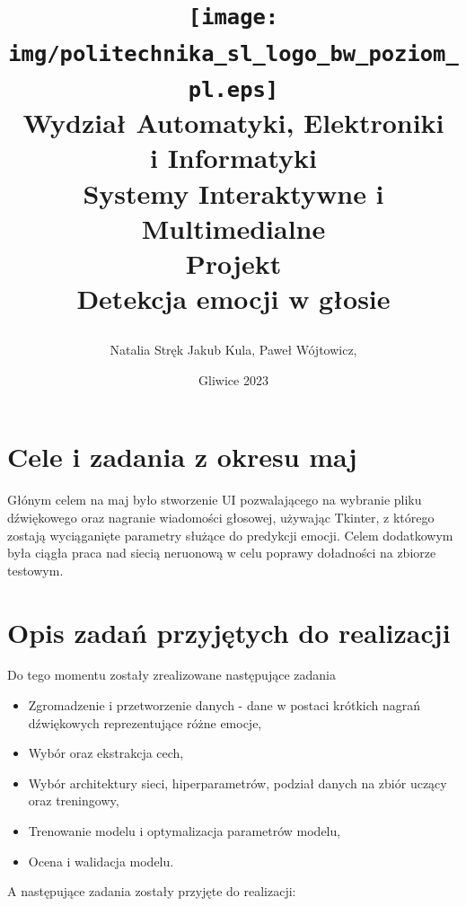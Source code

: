 \documentclass[12pt,titlepage]{article}
\title{
\texttt{[image: img/politechnika\_sl\_logo\_bw\_poziom\_pl.eps]}\\
\textbf{Wydział Automatyki, Elektroniki\\
i Informatyki}\\
\vspace*{1cm}
Systemy Interaktywne i Multimedialne \\ Projekt \\ Detekcja emocji w głosie

\vspace*{5cm}
}
\author{
Natalia Stręk
Jakub Kula,
Paweł Wójtowicz,
}
\date{Gliwice 2023}
\begin{document}
\maketitle

\tableofcontents

\newpage
\section{Cele i zadania z okresu maj}
Głónym celem na maj było stworzenie UI pozwalającego na wybranie pliku dźwiękowego oraz nagranie wiadomości głosowej, używając Tkinter, z którego zostają wyciąganięte parametry służące do predykcji emocji. Celem dodatkowym była ciągła praca nad siecią neruonową w celu poprawy doładności na zbiorze testowym.

\section{Opis zadań przyjętych do realizacji}
Do tego momentu zostały zrealizowane następujące zadania
\begin{itemize}
    \item Zgromadzenie i przetworzenie danych - dane w postaci krótkich nagrań dźwiękowych reprezentujące różne emocje,
    \item Wybór oraz ekstrakcja cech,
    \item Wybór architektury sieci, hiperparametrów, podział danych na zbiór uczący oraz treningowy,
    \item Trenowanie modelu i optymalizacja parametrów modelu,
    \item Ocena i walidacja modelu.
\end{itemize}

A następujące zadania zostały przyjęte do realizacji:
\end{document}
